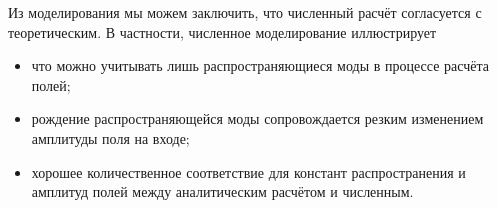 Из моделирования мы можем заключить, что численный расчёт согласуется с теоретическим. В частности, численное моделирование иллюстрирует 
\begin{itemize}
    \item что можно учитывать лишь распространяющиеся моды в процессе расчёта полей;
    \item рождение распространяющейся моды сопровождается резким изменением амплитуды поля на входе;
    \item хорошее количественное соответствие для констант распространения и амплитуд полей между аналитическим расчётом и численным.
\end{itemize}


